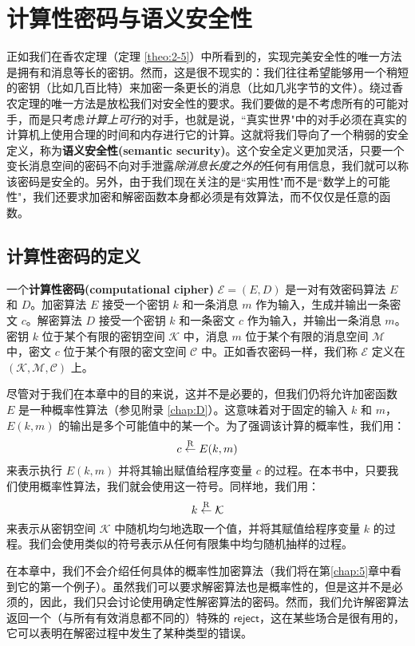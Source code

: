 \section{计算性密码与语义安全性}\label{sec:2-2}

正如我们在香农定理（定理 \ref{theo:2-5}）中所看到的，实现完美安全性的唯一方法是拥有和消息等长的密钥。然而，这是很不现实的：我们往往希望能够用一个稍短的密钥（比如几百比特）来加密一条更长的消息（比如几兆字节的文件）。绕过香农定理的唯一方法是放松我们对安全性的要求。我们要做的是不考虑所有的可能对手，而是只考虑\emph{计算上可行}的对手，也就是说，``真实世界"中的对手必须在真实的计算机上使用合理的时间和内存进行它的计算。这就将我们导向了一个稍弱的安全定义，称为\textbf{语义安全性(semantic security)}。这个安全定义更加灵活，只要一个变长消息空间的密码不向对手泄露\emph{除消息长度之外的}任何有用信息，我们就可以称该密码是安全的。另外，由于我们现在关注的是``实用性"而不是``数学上的可能性"，我们还要求加密和解密函数本身都必须是有效算法，而不仅仅是任意的函数。

\subsection{计算性密码的定义}\label{subsec:2-2-1}

一个\textbf{计算性密码(computational cipher)} $\mathcal{E}=(E,D)$ 是一对有效密码算法 $E$ 和 $D$。加密算法 $E$ 接受一个密钥 $k$ 和一条消息 $m$ 作为输入，生成并输出一条密文 $c$。解密算法 $D$ 接受一个密钥 $k$ 和一条密文 $c$ 作为输入，并输出一条消息 $m$。密钥 $k$ 位于某个有限的密钥空间 $\mathcal{K}$ 中，消息 $m$ 位于某个有限的消息空间 $\mathcal{M}$ 中，密文 $c$ 位于某个有限的密文空间 $\mathcal{C}$ 中。正如香农密码一样，我们称 $\mathcal{E}$ 定义在 $(\mathcal{K},\mathcal{M},\mathcal{C})$ 上。

尽管对于我们在本章中的目的来说，这并不是必要的，但我们仍将允许加密函数 $E$ 是一种概率性算法（参见附录 \ref{chap:D}）。这意味着对于固定的输入 $k$ 和 $m$，$E(k,m)$ 的输出是多个可能值中的某一个。为了强调该计算的概率性，我们用：
\[
c\overset{\rm R}\leftarrow E(k,m)
\]
来表示执行 $E(k,m)$ 并将其输出赋值给程序变量 $c$ 的过程。在本书中，只要我们使用概率性算法，我们就会使用这一符号。同样地，我们用：
\[
k\overset{\rm R}\leftarrow\mathcal{K}
\]
来表示从密钥空间 $\mathcal{K}$ 中随机均匀地选取一个值，并将其赋值给程序变量 $k$ 的过程。我们会使用类似的符号表示从任何有限集中均匀随机抽样的过程。

在本章中，我们不会介绍任何具体的概率性加密算法（我们将在第\ref{chap:5}章中看到它的第一个例子）。虽然我们可以要求解密算法也是概率性的，但是这并不是必须的，因此，我们只会讨论使用确定性解密算法的密码。然而，我们允许解密算法返回一个（与所有有效消息都不同的）特殊的 $\mathsf{reject}$，这在某些场合是很有用的，它可以表明在解密过程中发生了某种类型的错误。

